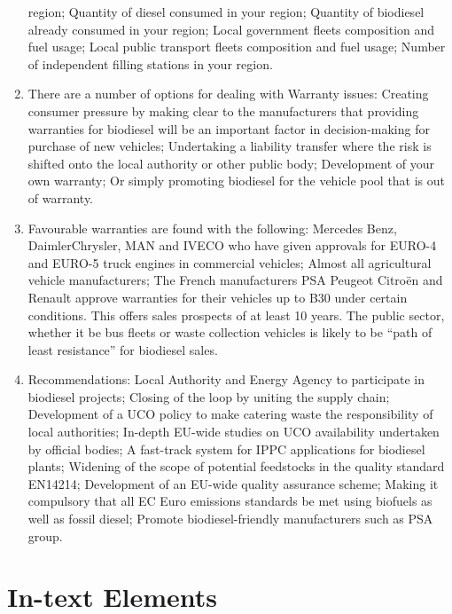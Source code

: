 \documentclass[11pt,fleqn]{book} %
\begin{document}
\begin{enumerate}
	region; Quantity of diesel consumed in your region; Quantity of biodiesel already
	consumed in your region; Local government fleets composition and fuel usage; Local
	public transport fleets composition and fuel usage; Number of independent filling stations
	in your region.
	\item There are a number of options for dealing with Warranty issues: Creating consumer
	pressure by making clear to the manufacturers that providing warranties for biodiesel will
	be an important factor in decision-making for purchase of new vehicles; Undertaking a
	liability transfer where the risk is shifted onto the local authority or other public body;
	Development of your own warranty; Or simply promoting biodiesel for the vehicle pool
	that is out of warranty.
	\item Favourable warranties are found with the following: Mercedes Benz, DaimlerChrysler,
	MAN and IVECO who have given approvals for EURO-4 and EURO-5 truck engines in
	commercial vehicles; Almost all agricultural vehicle manufacturers; The French
	manufacturers PSA Peugeot Citroën and Renault approve warranties for their vehicles up
	to B30 under certain conditions. This offers sales prospects of at least 10 years. The
	public sector, whether it be bus fleets or waste collection vehicles is likely to be “path of
	least resistance” for biodiesel sales.
	\item Recommendations: Local Authority and Energy Agency to participate in biodiesel
	projects; Closing of the loop by uniting the supply chain; Development of a UCO policy to
	make catering waste the responsibility of local authorities; In-depth EU-wide studies on
	UCO availability undertaken by official bodies; A fast-track system for IPPC applications
	for biodiesel plants; Widening of the scope of potential feedstocks in the quality standard
	EN14214; Development of an EU-wide quality assurance scheme; Making it compulsory
	that all EC Euro emissions standards be met using biofuels as well as fossil diesel;
	Promote biodiesel-friendly manufacturers such as PSA group.
\end{enumerate}




\chapter{In-text Elements}
\end{document}
